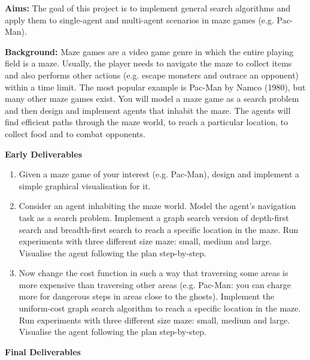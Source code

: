 \documentclass[]{final_report}
\begin{document}
\begin{minipage}{\textwidth}
\textbf{Aims:} The goal of this project is to implement general search algorithms and apply them to single-agent and multi-agent scenarios in maze games (e.g. Pac-Man).

\textbf{Background:} Maze games are a video game genre in which the entire playing field is a maze. Usually, the player needs to navigate the maze to collect items and also performs other actions (e.g. escape monsters and outrace an opponent) within a time limit. The most popular example is Pac-Man by Namco (1980), but many other maze games exist. You will model a maze game as a search problem and then design and implement agents that inhabit the maze. The agents will find efficient paths through the maze world, to reach a particular location, to collect food and to combat opponents.

\textbf{Early Deliverables}

\begin{enumerate}
    \item Given a maze game of your interest (e.g. Pac-Man), design and implement a simple graphical visualisation for it.
    \item Consider an agent inhabiting the maze world. Model the agent's navigation task as a search problem. Implement a graph search version of depth-first search and breadth-first search to reach a specific location in the maze. Run experiments with three different size maze: small, medium and large. Visualise the agent following the plan step-by-step.
    \item Now change the cost function in such a way that traversing some areas is more expensive than traversing other areas (e.g. Pac-Man: you can charge more for dangerous steps in areas close to the ghosts). Implement the uniform-cost graph search algorithm to reach a specific location in the maze. Run experiments with three different size maze: small, medium and large. Visualise the agent following the plan step-by-step.
\end{enumerate}

\textbf{Final Deliverables}


\end{minipage}
\end{document}
